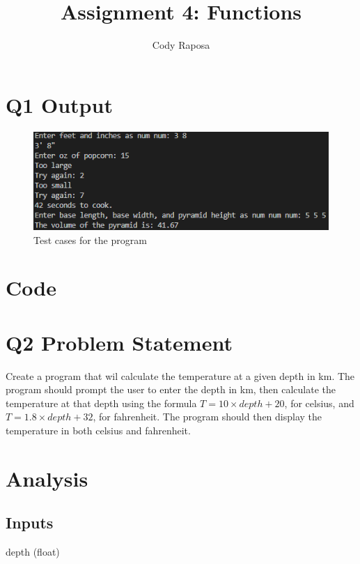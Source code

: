 \documentclass{article}
\title{Assignment 4: Functions}
\author{Cody Raposa}
\affil{ELEC2850 Microcontrollers Using C Programming}
\begin{document}
\maketitle
\begin{flushleft}
  \section{Q1 Output}
  \begin{figure}[!h]
    \begin{centering}
      \includegraphics[scale=1]{Q1_output.png}
      \caption{Test cases for the program}
    \end{centering}
  \end{figure}
  \newpage
  \section{Code}
  
  \newpage
  \section{Q2 Problem Statement}
  Create a program that wil calculate the temperature at a given depth in km. The program should prompt the user to enter the depth in km, then calculate the temperature at that depth using the formula $T = 10 \times depth + 20$, for celsius, and $T = 1.8 \times depth + 32$, for fahrenheit. The program should then display the temperature in both celsius and fahrenheit.
  \section{Analysis}
  \subsection{Inputs}
  depth (float)

\end{flushleft}
\end{document}
